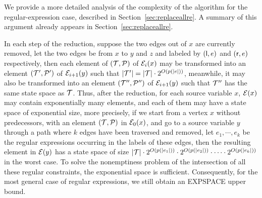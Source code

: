 We provide a more detailed analysis of the complexity of the algorithm for the regular-expression case, described in Section~\ref{sec:replaceallre}.
A summary of this argument already appears in Section~\ref{sec:replaceallre}.

In each step of the reduction, suppose the two edges out of $x$ are currently removed, let the two edges be from $x$ to $y$ and $z$ and labeled by $({\sf l}, e)$ and $({\sf r}, e)$ respectively, then each element of $(\mathcal{T}, \mathcal{P})$ of $\mathcal{E}_i(x)$ may be transformed into an element $(\mathcal{T}',\mathcal{P}')$ of $\mathcal{E}_{i+1}(y)$ such that $|\mathcal{T}'| = |\mathcal{T}| \cdot 2^{O(p(|e|))}$, meanwhile, it may also be transformed into an element $(\mathcal{T}'',\mathcal{P}'')$ of $\mathcal{E}_{i+1}(y)$ such that $\mathcal{T}''$ has the same state space as $\mathcal{T}$. Thus, after the reduction, for each source variable $x$, $\mathcal{E}(x)$ may contain exponentially many elements, and each of them may have a state space of exponential size, more precisely, if we start from a vertex $x$ without predecessors, with an element $(\mathcal{T},\mathcal{P})$ in $\mathcal{E}_0(x)$, and go to a source variable $y$ through a path where $k$ edges have been traversed and removed, let $e_1,\cdots, e_k$ be the regular expressions occurring in the labels of these edges, then the resulting element in $\mathcal{E}(y)$ has a state space of size $|\mathcal{T}| \cdot 2^{O(p(|e_1|))} \cdot 2^{O(p(|e_2|))} \cdot \cdots \cdot 2^{O(p(|e_k|))}$ in the worst case. To solve the nonemptiness problem of the intersection of all these regular constraints, the exponential space is sufficient. Consequently, for the most general case of regular expressions, we still obtain an EXPSPACE upper bound. 

